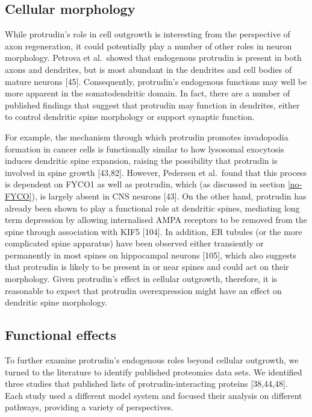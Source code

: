 \documentclass[
  12pt,
  a4paper,
]{book}
\begin{document}
\hypertarget{cellular-morphology}{%
\subsection{Cellular morphology}\label{cellular-morphology}}

While protrudin's role in cell outgrowth is interesting from the perspective of axon regeneration, it could potentially play a number of other roles in neuron morphology. Petrova et al.~showed that endogenous protrudin is present in both axons and dendrites, but is most abundant in the dendrites and cell bodies of mature neurons {[}45{]}. Consequently, protrudin's endogenous functions may well be more apparent in the somatodendritic domain. In fact, there are a number of published findings that suggest that protrudin may function in dendrites, either to control dendritic spine morphology or support synaptic function.

For example, the mechanism through which protrudin promotes invadopodia formation in cancer cells is functionally similar to how lysosomal exocytosis induces dendritic spine expansion, raising the possibility that protrudin is involved in spine growth {[}43,82{]}. However, Pedersen et al.~found that this process is dependent on FYCO1 as well as protrudin, which (as discussed in section \ref{no-FYCO}), is largely absent in CNS neurons {[}43{]}. On the other hand, protrudin has already been shown to play a functional role at dendritic spines, mediating long term depression by allowing internalised AMPA receptors to be removed from the spine through association with KIF5 {[}104{]}. In addition, ER tubules (or the more complicated spine apparatus) have been observed either transiently or permanently in most spines on hippocampal neurons {[}105{]}, which also suggests that protrudin is likely to be present in or near spines and could act on their morphology. Given protrudin's effect in cellular outgrowth, therefore, it is reasonable to expect that protrudin overexpression might have an effect on dendritic spine morphology.

\hypertarget{functional-effects}{%
\subsection{Functional effects}\label{functional-effects}}

To further examine protrudin's endogenous roles beyond cellular outgrowth, we turned to the literature to identify published proteomics data sets. We identified three studies that published lists of protrudin-interacting proteins {[}38,44,48{]}. Each study used a different model system and focused their analysis on different pathways, providing a variety of perspectives.
\end{document}
